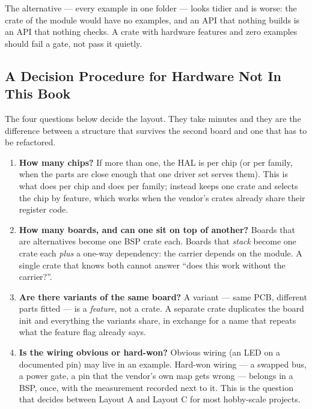 The alternative — every example in one folder — looks tidier and is worse: the crate of the
module would have no examples, and an API that nothing builds is an API that nothing checks.
A crate with hardware features and zero examples should fail a gate, not pass it quietly.

\subsection{A Decision Procedure for Hardware Not In This Book}

The four questions below decide the layout. They take minutes and they are the difference
between a structure that survives the second board and one that has to be refactored.

\begin{enumerate}
    \item \textbf{How many chips?} If more than one, the HAL is per chip (or per family, when
          the parts are close enough that one driver set serves them). This is what
           does per chip and  does per family;
           instead keeps one crate and selects the chip by feature, which
          works when the vendor's crates already share their register code.
    \item \textbf{How many boards, and can one sit on top of another?} Boards that are
          alternatives become one BSP crate each. Boards that \emph{stack} become one crate
          each \emph{plus} a one-way dependency: the carrier depends on the module. A single
          crate that knows both cannot answer ``does this work without the carrier?''.
    \item \textbf{Are there variants of the same board?} A variant — same PCB, different
          parts fitted — is a \emph{feature}, not a crate. A separate crate duplicates the
          board init and everything the variants share, in exchange for a name that repeats
          what the feature flag already says.
    \item \textbf{Is the wiring obvious or hard-won?} Obvious wiring (an LED on a documented
          pin) may live in an example. Hard-won wiring — a swapped bus, a power gate, a pin
          that the vendor's own map gets wrong — belongs in a BSP, once, with the measurement
          recorded next to it. This is the question that decides between Layout A and
          Layout C for most hobby-scale projects.
\end{enumerate}

